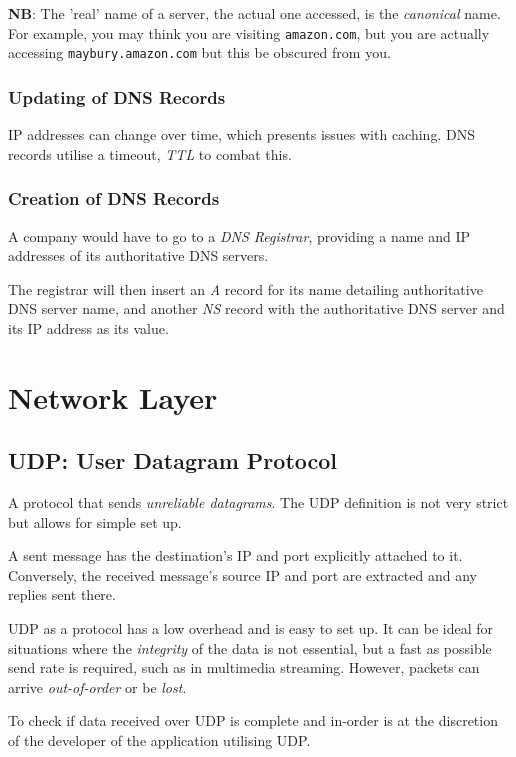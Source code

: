 \documentclass{article}
\begin{document}
\textbf{NB}: The 'real' name of a server, the actual one accessed, is the \textit{canonical} name. For example, you may think you are visiting \texttt{amazon.com}, but you are actually accessing \texttt{maybury.amazon.com} but this be obscured from you.

\subsubsection{Updating of DNS Records}

IP addresses can change over time, which presents issues with caching. DNS records utilise a timeout, \textit{TTL} to combat this. 

\subsubsection{Creation of DNS Records}

A company would have to go to a \textit{DNS Registrar}, providing a name and IP addresses of its authoritative DNS servers.

The registrar will then insert an \textit{A} record for its name detailing authoritative DNS server name, and another \textit{NS} record with the authoritative DNS server and its IP address as its value.

\newpage
\section{Network Layer}

\subsection{UDP: User Datagram Protocol}

A protocol that sends \textit{unreliable datagrams}. The UDP definition is not very strict but allows for simple set up.

A sent message has the destination's IP and port explicitly attached to it. Conversely, the received message's source IP and port are extracted and any replies sent there.

UDP as a protocol has a low overhead and is easy to set up. It can be ideal for situations where the \textit{integrity} of the data is not essential, but a fast as possible send rate is required, such as in multimedia streaming. However, packets can arrive \textit{out-of-order} or be \textit{lost}.

To check if data received over UDP is complete and in-order is at the discretion of the developer of the application utilising UDP.
\end{document}
